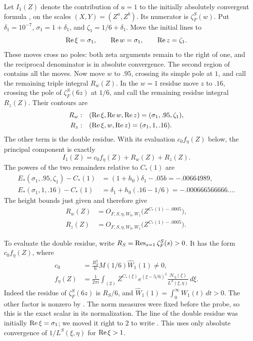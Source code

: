 Let \(I_1(Z)\) denote the contribution of \(u=1\) to the initially
absolutely convergent formula , on the scales
\((X,Y)=(Z^a,Z^b)\).  Its numerator is \(\zeta_F^S(w)\).  Put
\(\delta_1=10^{-7}\), \(\sigma_1=1+\delta_1\), and
\(\zeta_1=1/6+\delta_1\).  Move the initial lines to
\[
 \operatorname{Re}\xi=\sigma_1,\qquad \operatorname{Re} w=\sigma_1,\qquad \operatorname{Re} z=\zeta_1.
\]
These moves cross no poles: both zeta arguments remain to the right of
one, and the reciprocal denominator is in absolute convergence.
The second region of  contains all the moves.
Now move \(w\) to \(.95\), crossing its simple pole at \(1\), and call
the remaining triple integral \(R_w(Z)\).  In the \(w=1\) residue move
\(z\) to \(.16\), crossing the pole of \(\zeta_F^S(6z)\) at \(1/6\),
and call the remaining residue integral \(R_z(Z)\).  Their contours are
\[
 \begin{aligned}
 R_w:&\quad (\operatorname{Re}\xi,\operatorname{Re} w,\operatorname{Re} z)=(\sigma_1,.95,\zeta_1),\\
 R_z:&\quad (\operatorname{Re}\xi,w,\operatorname{Re} z)=(\sigma_1,1,.16).
 \end{aligned}
\]
The other term is the double residue.  With its evaluation
\(c_0f_\eta(Z)\) below, the principal component is exactly
\[
 I_1(Z)=c_0f_\eta(Z)+R_w(Z)+R_z(Z).
\]
The powers of the two remainders relative to \(C_*(1)\) are
\[
 \begin{split}
 E_*(\sigma_1,.95,\zeta_1)-C_*(1)
       &=(1+h_0)\delta_1-.05b=-.00664989,\\
 E_*(\sigma_1,1,.16)-C_*(1)
       &=\delta_1+h_0(.16-1/6)
          =-.000666566666\ldots .
 \end{split}
\]
The height bounds just given and  therefore give
\begin{equation}
 \begin{aligned}
 R_w(Z)&=O_{F,S,\eta,W_0,W_1}\bigl(Z^{C_*(1)-.0005}\bigr),\\
 R_z(Z)&=O_{F,S,\eta,W_0,W_1}\bigl(Z^{C_*(1)-.0005}\bigr).
 \end{aligned}
\label{eq:principal-remainders}
\end{equation}

To evaluate the double residue, write
\(R_S=\operatorname{Res}_{s=1}\zeta_F^S(s)>0\).  It has the form
\(c_0f_\eta(Z)\), where
\begin{equation}
 \begin{split}
 c_0&=\frac{R_S^2}{6}M(1/6)\widehat W_1(1)\ne0,\\
 f_\eta(Z)&=\frac1{2\pi i}\int_{(2)}
        Z^{C_*(\xi)}e^{(\xi-5/6)^2}
        \frac{\mathcal H_\eta(\xi)}{L^S(\xi,\eta)}\,d\xi .
 \end{split}
\label{eq:principal-Mellin-integral}
\end{equation}
Indeed the residue of \(\zeta_F^S(6z)\) is \(R_S/6\), and
\(\widehat W_1(1)=\int_0^\infty W_1(t)\,dt>0\).  The other factor is
nonzero by .  The norm measures were
fixed before the probe, so this is the exact scalar in its normalization.
The line of the double residue was initially \(\operatorname{Re}\xi=\sigma_1\); we
moved it right to \(2\) to write .
This uses only absolute convergence of \(1/L^S(\xi,\eta)\) for
\(\operatorname{Re}\xi>1\).

